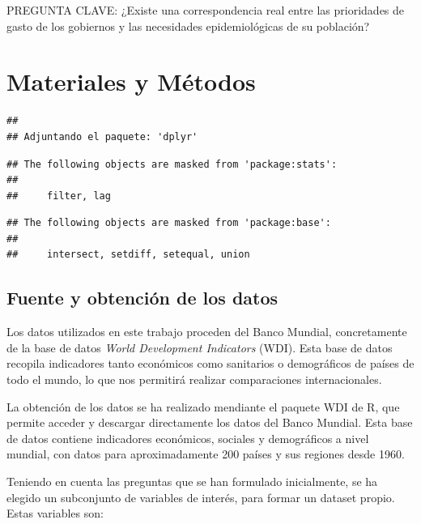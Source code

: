 \documentclass[notspecified,article,submit,moreauthors,pdftex]{Definitions/mdpi}
\begin{document}
PREGUNTA CLAVE: ¿Existe una correspondencia real entre las prioridades
de gasto de los gobiernos y las necesidades epidemiológicas de su
población?

\section{Materiales y Métodos}\label{materiales-y-muxe9todos}

\begin{verbatim}
## 
## Adjuntando el paquete: 'dplyr'
\end{verbatim}

\begin{verbatim}
## The following objects are masked from 'package:stats':
## 
##     filter, lag
\end{verbatim}

\begin{verbatim}
## The following objects are masked from 'package:base':
## 
##     intersect, setdiff, setequal, union
\end{verbatim}

\subsection{Fuente y obtención de los
datos}\label{fuente-y-obtenciuxf3n-de-los-datos}

Los datos utilizados en este trabajo proceden del Banco Mundial,
concretamente de la base de datos \emph{World Development Indicators}
(WDI). Esta base de datos recopila indicadores tanto económicos como
sanitarios o demográficos de países de todo el mundo, lo que nos
permitirá realizar comparaciones internacionales.

La obtención de los datos se ha realizado mendiante el paquete WDI de R,
que permite acceder y descargar directamente los datos del Banco
Mundial. Esta base de datos contiene indicadores económicos, sociales y
demográficos a nivel mundial, con datos para aproximadamente 200 países
y sus regiones desde 1960.

Teniendo en cuenta las preguntas que se han formulado inicialmente, se
ha elegido un subconjunto de variables de interés, para formar un
dataset propio. Estas variables son:
\end{document}
